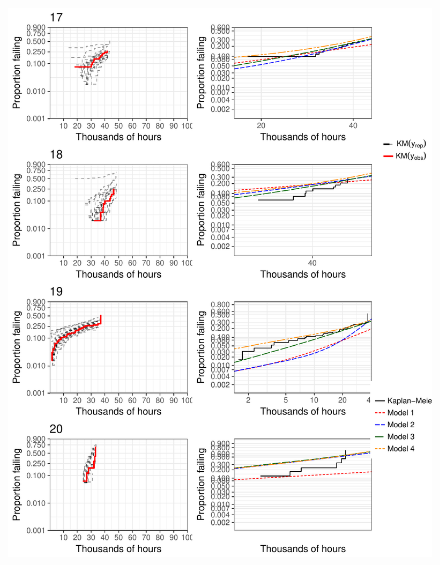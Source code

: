 \documentclass[12pt]{article}
\begin{document}
\begin{figure}[H]
\includegraphics[width=\textwidth]{ppcheck-v2-5.pdf}
\end{figure}
\end{document}
